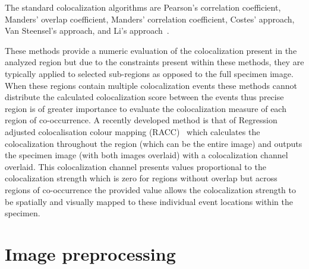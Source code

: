The standard colocalization algorithms are Pearson's correlation coefficient, Manders' overlap coefficient, Manders' correlation coefficient, Costes' approach, Van Steensel's approach, and Li's approach~\cite{Bolte-2006, practical_guide_coloc}.\par These methods provide a numeric evaluation of the colocalization present in the analyzed region but due to the constraints present within these methods, they are typically applied to selected sub-regions as opposed to the full specimen image. When these regions contain multiple colocalization events these methods cannot distribute the calculated colocalization score between the events thus precise region is of greater importance to evaluate the colocalization measure of each region of co-occurrence. A recently developed method is that of Regression adjusted colocalisation colour mapping (RACC)~\cite{racc} which calculates the colocalization throughout the region (which can be the entire image) and outputs the specimen image (with both images overlaid) with a colocalization channel overlaid. This colocalization channel presents values proportional to the colocalization strength which is zero for regions without overlap but across regions of co-occurrence the provided value allows the colocalization strength to be spatially and visually mapped to these individual event locations within the specimen.

\section{Image preprocessing}\label{sec:image_prepro}

